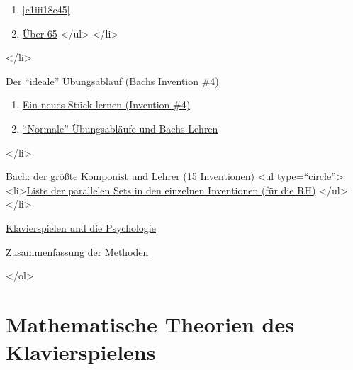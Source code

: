 {\begin{enumerate}[label={\alph*.}]
               \item \hyperref[c1iii18c45]{\autoref{c1iii18c45}}
               \item \hyperref[c1iii18c65]{Über 65}
            </ul>
        </li>
      \end{enumerate}
 </li>
 \item \hyperref[c1iii19]{Der \enquote{ideale} Übungsablauf (Bachs Invention \#4)}
     \begin{enumerate}[label={\alph*.}] 
        <li>\hyperref[c1iii19a]{Die Regeln lernen}
        \item \hyperref[c1iii19b]{Ein neues Stück lernen (Invention \#4)}
        \item \hyperref[c1iii19c]{\enquote{Normale} Übungsabläufe und Bachs Lehren}
      \end{enumerate}
 </li>
 \item \hyperref[c1iii20]{Bach: der größte Komponist und Lehrer (15 Inventionen)}
   <ul type=\enquote{circle}>
    <li>\hyperref[c1iii20ps]{Liste der parallelen Sets in den einzelnen Inventionen (für die RH)}
   </ul>
 </li>
 \item \hyperref[c1iii21]{Klavierspielen und die Psychologie}
 \item \hyperref[c1iii22]{Zusammenfassung der Methoden}

</ol>

\section{Mathematische Theorien des Klavierspielens}

}
